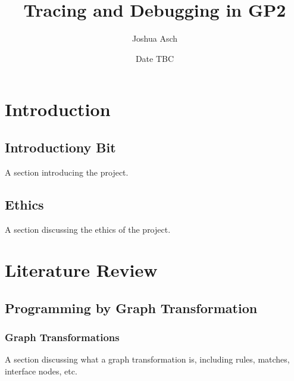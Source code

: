 \documentclass[authoryearcitations]{UoYCSproject}
\author{Joshua Asch}
\title{Tracing and Debugging in GP2}
\date{Date TBC}
\begin{document}
\maketitle
\listoffigures
\listoftables

\cleardoublepage

\chapter{Introduction}
\label{cha:Introduction}

\section{Introductiony Bit}
\label{sec:IntroductionyBit}

A section introducing the project.

\section{Ethics}
\label{sec:Ethics}

A section discussing the ethics of the project.



\cleardoublepage

\chapter{Literature Review}
\label{cha:LiteratureReview}


\section{Programming by Graph Transformation}
\label{sec:ProgrammingByGraphTransformation}


\subsection{Graph Transformations}
\label{sec:GraphTransformations}

A section discussing what a graph transformation is, including rules, matches,
interface nodes, etc.

\end{document}
